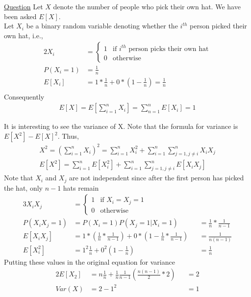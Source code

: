 \documentclass[11pt, a4paper]{article}
\begin{document}
\begin{enumerate}
        \hypertarget{a_hatproblem}{\item} \hyperlink{q_hatproblem}{Question}\newline
        Let $X$ denote the number of people who pick their own hat. We have been asked $E[X]$.\\
        Let $X_{i}$ be a binary random variable denoting whether the $i^{th}$ person picked their own hat, i.e.,
        \begin{alignat*}{2}
            X_{i} &= \begin{cases} 1 &\mbox{if $i^{th}$ person picks their own hat}\\ 
                                    0 &\mbox{otherwise} \end{cases} \\
            P(X_{i} = 1) &= \frac{1}{n} \\
            E[X_{i}] &= 1 * \frac{1}{n} + 0 * (1 - \frac{1}{n}) = \frac{1}{n}\\
        \end{alignat*}
        Consequently
        \begin{align*}
            E[X] = E[\sum_{i=1}^{n} X_{i}] = \sum_{n=1}^{n}E[X_{i}] = 1
        \end{align*}

        It is interesting to see the variance of X. Note that the formula for variance is $E[X^{2}] - E[X]^{2}$. Thus,
        \begin{align*}
            X^{2} = (\sum_{i=1}^{n} X_{i})^{2} = \sum_{i=1}^{n} X_{i}^{2} + \sum_{i=1}^{n} \sum_{j=1, j\neq i}^{n} X_{i}X{_j} \\
            E[X^{2}] = \sum_{i=1}^{n}E[X_{i}^{2}] + \sum_{i=1}^{n} \sum_{j=1, j\neq i}^{n} E[X_{i}X{_j}] 
        \end{align*}
        Note that $X_{i}$ and $X_{j}$ are not independent since after the first person has picked the hat, only $n-1$ hats remain
        \begin{alignat*}{3}
            X_{i}X_{j} &= \begin{cases} 1 &\mbox{if $X_{i} = X_{j} = 1$}\\
                                       0 &\mbox{otherwise} \end{cases} \\
            P(X_{i}X_{j} = 1) &= P(X_{i} = 1) P(X_{j} = 1|X_{i} = 1) &&= \frac{1}{n} * \frac{1}{n-1}\\
            E[X_{i}X_{j}] &= 1 * (\frac{1}{n} * \frac{1}{n-1}) + 0 * (1 - \frac{1}{n} * \frac{1}{n-1}) &&= \frac{1}{n(n-1)}\\
            E[X_{i}^2] &= 1^{2} \frac{1}{n} + 0^{2} (1-\frac{1}{n}) &&= \frac{1}{n}
        \end{alignat*}
        Putting these values in the original equation for variance
        \begin{alignat*}{2}
            E[X_{2}] &= n \frac{1}{n} + \frac{1}{n} \frac{1}{n-1} (\frac{n(n-1)}{2} * 2) &&= 2\\
            Var(X) &= 2 - 1^{2} &&= 1
        \end{alignat*}
        


\end{enumerate}
\end{document}
